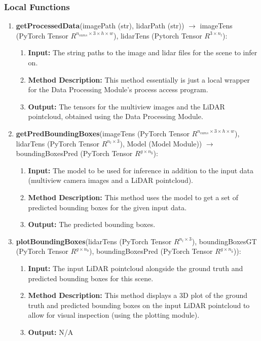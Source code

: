 \documentclass[12pt, titlepage]{article}
\begin{document}
\subsubsection{Local Functions}
\begin{enumerate}
  \item \textbf{getProcessedData}(imagePath (str), lidarPath (str)) $\rightarrow$ imageTens (PyTorch Tensor $R^{n_{cams}\times{}3\times{}h\times{}w}$), lidarTens (Pytorch Tensor $R^{3\times{}n_{l}}$):
  \begin{enumerate}
    \item \textbf{Input:} The string paths to the image and lidar files for the scene to infer on.
    \item \textbf{Method Description:} This method essentially is just a local wrapper for the Data Processing Module's process access program.
    \item \textbf{Output:} The tensors for the multiview images and the LiDAR pointcloud, obtained using the Data Processing Module.
  \end{enumerate}
  \item \textbf{getPredBoundingBoxes}(imageTens (PyTorch Tensor $R^{n_{cams}\times{}3\times{}h\times{}w}$), lidarTens (PyTorch Tensor $R^{n_{l}\times{}3}$), Model (Model Module)) $\rightarrow$ boundingBoxesPred (PyTorch Tensor $R^{g\times{}n_{\hat{b}}}$):
  \begin{enumerate}
    \item \textbf{Input:} The model to be used for inference in addition to the input data (multiview camera images and a LiDAR pointcloud).
    \item \textbf{Method Description:} This method uses the model to get a set of predicted bounding boxes for the given input data.
    \item \textbf{Output:} The predicted bounding boxes.
  \end{enumerate}
  \item \textbf{plotBoundingBoxes}(lidarTens (PyTorch Tensor $R^{n_{l}\times{}3}$), boundingBoxesGT (PyTorch Tensor $R^{g\times{}n_{b}}$), boundingBoxesPred (PyTorch Tensor $R^{g\times{}n_{\hat{b}}}$)):
  \begin{enumerate}
    \item \textbf{Input:} The input LiDAR pointcloud alongside the ground truth and predicted bounding boxes for this scene. 
    \item \textbf{Method Description:} This method displays a 3D plot of the ground truth and predicted bounding boxes on the input LiDAR pointcloud to allow for visual inspection (using the plotting module).
    \item \textbf{Output:} N/A
  \end{enumerate}
\end{enumerate}
\end{document}
